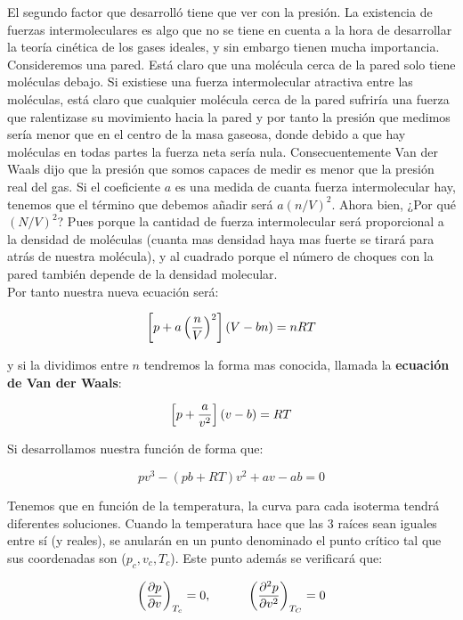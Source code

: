 \documentclass[12pt]{book}
\begin{document}
El segundo factor que desarrolló tiene que ver con la presión. La existencia de fuerzas intermoleculares es algo que no se tiene en cuenta a la hora de desarrollar la teoría cinética de los gases ideales, y sin embargo tienen mucha importancia. Consideremos una pared. Está claro que una molécula cerca de la pared solo tiene moléculas debajo. Si existiese una fuerza intermolecular atractiva entre las moléculas, está claro que cualquier molécula cerca de la pared sufriría una fuerza que ralentizase su movimiento hacia la pared y por tanto la presión que medimos sería menor que en el centro de la masa gaseosa, donde debido a que hay moléculas en todas partes la fuerza neta sería nula. Consecuentemente Van der Waals dijo que la presión que somos capaces de medir es menor que la presión real del gas. Si el coeficiente $a$ es una medida de cuanta fuerza intermolecular hay, tenemos que el término que debemos añadir será $a(n/V)^2$. Ahora bien, ¿Por qué $(N/V)^2$? Pues porque la cantidad de fuerza intermolecular será proporcional a la densidad de moléculas (cuanta mas densidad haya mas fuerte se tirará para atrás de nuestra molécula), y al cuadrado porque el número de choques con la pared también depende de la densidad molecular. \\

Por tanto nuestra nueva ecuación será:

\begin{equation}
\left[ p+a\left( \dfrac{n}{V} \right)^2 \right] (V-bn) = nRT
\end{equation}

y si la dividimos entre $n$ tendremos la forma mas conocida, llamada la \textbf{ecuación de Van der Waals}:

\begin{equation}
\left[ p+\dfrac{a}{v^2} \right] (v-b) = RT
\end{equation}

Si desarrollamos nuestra función de forma que:

\begin{equation}
pv^3 - (pb+RT)v^2 +a v - ab = 0
\end{equation}

Tenemos que en función de la temperatura, la curva para cada isoterma tendrá diferentes soluciones. Cuando la temperatura hace que las 3 raíces sean iguales entre sí (y reales), se anularán en un punto denominado el punto crítico tal que sus coordenadas son ($p_c,v_c,T_c$). Este punto además se verificará que:

\begin{equation}
\left( \frac{\partial p}{\partial v} \right)_{T_c} = 0, \quad \quad \quad \left( \frac{\partial ^2 p}{\partial v^2} \right)_{T_C} = 0
\end{equation}
\end{document}
